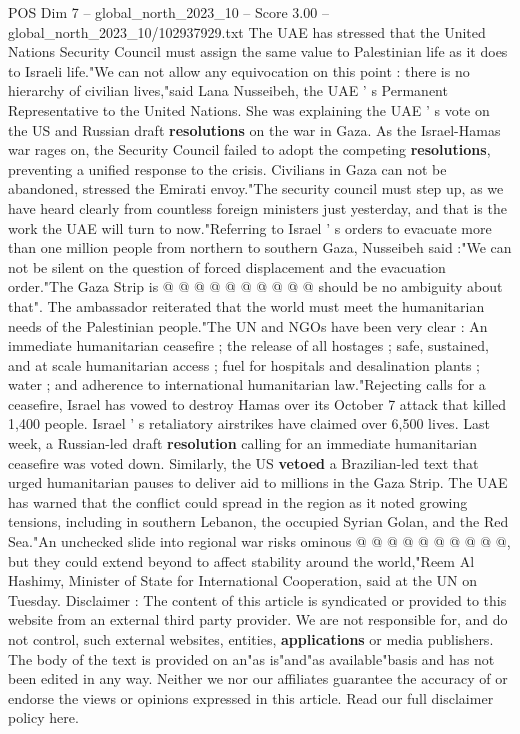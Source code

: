 \begin{textsample}{POS Dim 7 – global\_north\_2023\_10 – Score 3.00 – global\_north\_2023\_10/102937929.txt}  \label{ex:f7_pos_420}
The UAE has stressed that the United Nations Security Council must assign the same value to Palestinian life as it does to Israeli life."We can not allow any equivocation on this point : there is no hierarchy of civilian lives,"said Lana Nusseibeh, the UAE ' s Permanent Representative to the United Nations.
She was explaining the UAE ' s vote on the US and Russian draft \textbf{resolutions} on the war in Gaza.
As the Israel-Hamas war rages on, the Security Council failed to adopt the competing \textbf{resolutions}, preventing a unified response to the crisis.
Civilians in Gaza can not be abandoned, stressed the Emirati envoy."The security council must step up, as we have heard clearly from countless foreign ministers just yesterday, and that is the work the UAE will turn to now."Referring to Israel ' s orders to evacuate more than one million people from northern to southern Gaza, Nusseibeh said :"We can not be silent on the question of forced displacement and the evacuation order."The Gaza Strip is @ @ @ @ @ @ @ @ @ @ should be no ambiguity about that".
The ambassador reiterated that the world must meet the humanitarian needs of the Palestinian people."The UN and NGOs have been very clear : An immediate humanitarian ceasefire ; the release of all hostages ; safe, sustained, and at scale humanitarian access ; fuel for hospitals and desalination plants ; water ; and adherence to international humanitarian law."Rejecting calls for a ceasefire, Israel has vowed to destroy Hamas over its October 7 attack that killed 1,400 people.
Israel ' s retaliatory airstrikes have claimed over 6,500 lives.
Last week, a Russian-led draft \textbf{resolution} calling for an immediate humanitarian ceasefire was voted down.
Similarly, the US \textbf{vetoed} a Brazilian-led text that urged humanitarian pauses to deliver aid to millions in the Gaza Strip.
The UAE has warned that the conflict could spread in the region as it noted growing tensions, including in southern Lebanon, the occupied Syrian Golan, and the Red Sea."An unchecked slide into regional war risks ominous @ @ @ @ @ @ @ @ @ @, but they could extend beyond to affect stability around the world,"Reem Al Hashimy, Minister of State for International Cooperation, said at the UN on Tuesday.
Disclaimer : The content of this article is syndicated or provided to this website from an external third party provider.
We are not responsible for, and do not control, such external websites, entities, \textbf{applications} or media publishers.
The body of the text is provided on an"as is"and"as available"basis and has not been edited in any way.
Neither we nor our affiliates guarantee the accuracy of or endorse the views or opinions expressed in this article.
Read our full disclaimer policy here.

\end{textsample}

